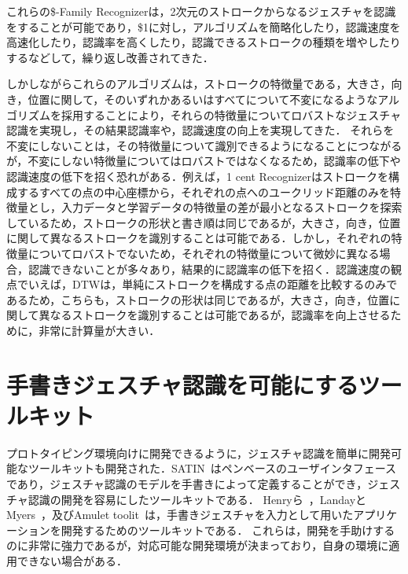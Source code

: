 これらの\$-Family Recognizerは，2次元のストロークからなるジェスチャを認識をすることが可能であり，\$1に対し，アルゴリズムを簡略化したり，認識速度を高速化したり，認識率を高くしたり，認識できるストロークの種類を増やしたりするなどして，繰り返し改善されてきた．

しかしながらこれらのアルゴリズムは，ストロークの特徴量である，大きさ，向き，位置に関して，そのいずれかあるいはすべてについて不変になるようなアルゴリズムを採用することにより，それらの特徴量についてロバストなジェスチャ認識を実現し，その結果認識率や，認識速度の向上を実現してきた．
それらを不変にしないことは，その特徴量について識別できるようになることにつながるが，不変にしない特徴量についてはロバストではなくなるため，認識率の低下や認識速度の低下を招く恐れがある．例えば，1 cent Recognizerはストロークを構成するすべての点の中心座標から，それぞれの点へのユークリッド距離のみを特徴量とし，入力データと学習データの特徴量の差が最小となるストロークを探索しているため，ストロークの形状と書き順は同じであるが，大きさ，向き，位置に関して異なるストロークを識別することは可能である．しかし，それぞれの特徴量についてロバストでないため，それぞれの特徴量について微妙に異なる場合，認識できないことが多々あり，結果的に認識率の低下を招く．認識速度の観点でいえば，DTWは，単純にストロークを構成する点の距離を比較するのみであるため，こちらも，ストロークの形状は同じであるが，大きさ，向き，位置に関して異なるストロークを識別することは可能であるが，認識率を向上させるために，非常に計算量が大きい．

\section{手書きジェスチャ認識を可能にするツールキット}
プロトタイピング環境向けに開発できるように，ジェスチャ認識を簡単に開発可能なツールキットも開発された．SATIN~\cite{Hong:2000:STI:354401.354412}はペンベースのユーザインタフェースであり，ジェスチャ認識のモデルを手書きによって定義することができ，ジェスチャ認識の開発を容易にしたツールキットである．
Henryら~\cite{Henry:1990:IGS:97924.97938}，LandayとMyers~\cite{Landay:1993:EEU:259964.260123}，及びAmulet toolit~\cite{Myers:1997:AEN:262050.260628}は，手書きジェスチャを入力として用いたアプリケーションを開発するためのツールキットである．
これらは，開発を手助けするのに非常に強力であるが，対応可能な開発環境が決まっており，自身の環境に適用できない場合がある．

